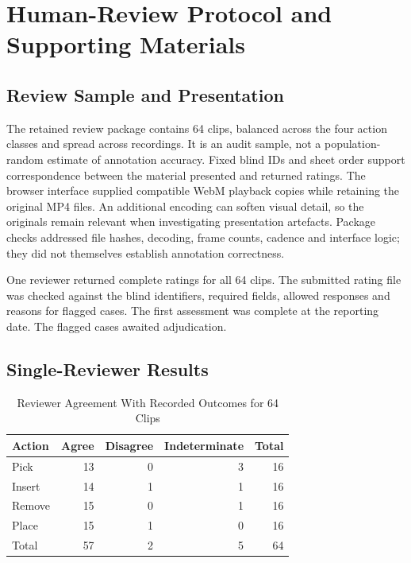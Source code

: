 \chapter{Human-Review Protocol and Supporting Materials}
\label{app:human-review}

\section{Review Sample and Presentation}

The retained review package contains 64 clips, balanced across the four action classes
and spread across recordings. It is an audit sample, not a population-random estimate of
annotation accuracy. Fixed blind IDs and sheet order support correspondence between the
material presented and returned ratings. The browser interface supplied compatible WebM
playback copies while retaining the original MP4 files. An additional encoding can
soften visual detail, so the originals remain relevant when investigating presentation
artefacts. Package checks addressed file hashes, decoding, frame counts, cadence and
interface logic; they did not themselves establish annotation correctness.

One reviewer returned complete ratings for all 64 clips. The submitted rating file was
checked against the blind identifiers, required fields, allowed responses and reasons
for flagged cases. The first assessment was complete at the reporting date. The flagged
cases awaited adjudication.

\section{Single-Reviewer Results}

\begin{table}[htbp]
\caption{Reviewer Agreement With Recorded Outcomes for 64 Clips}\label{tab:human-review-outcomes}
\centering

\begin{tabular}{lrrrr}
\toprule Action & Agree & Disagree & Indeterminate & Total \\
\midrule
Pick &13&0&3&16\\
Insert &14&1&1&16\\
Remove &15&0&1&16\\
Place &15&1&0&16\\
\midrule
Total &57&2&5&64\\
\bottomrule
\end{tabular}
\end{table}

